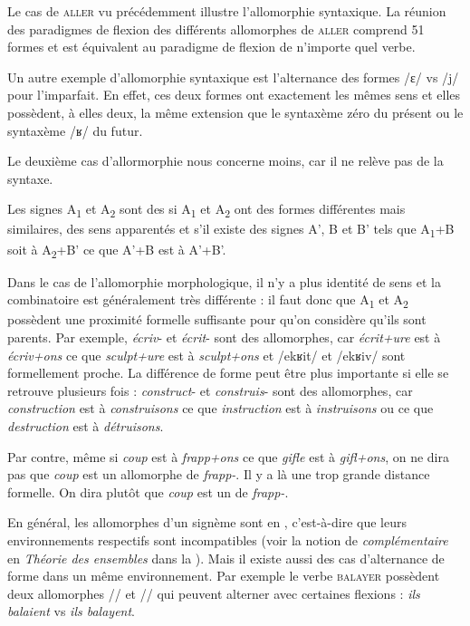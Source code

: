 Le cas de \textsc{aller} vu précédemment illustre l’allomorphie syntaxique. La réunion des paradigmes de flexion des différents allomorphes de \textsc{aller} comprend 51 formes et est équivalent au paradigme de flexion de n’importe quel verbe.

Un autre exemple d’allomorphie syntaxique est l’alternance des formes /ɛ/ vs /j/ pour l’imparfait. En effet, ces deux formes ont exactement les mêmes sens et elles possèdent, à elles deux, la même extension que le syntaxème zéro du présent ou le syntaxème /ʁ/ du futur.

Le deuxième cas d’allormorphie nous concerne moins, car il ne relève pas de la syntaxe.

\begin{styleLivreImportant}
Les signes A\textsubscript{1} et A\textsubscript{2} sont des  si A\textsubscript{1} et A\textsubscript{2} ont des formes différentes mais similaires, des sens apparentés et s’il existe des signes A’, B et B’ tels que A\textsubscript{1}+B soit à A\textsubscript{2}+B’ ce que A’+B est à A’+B’.
\end{styleLivreImportant}

Dans le cas de l’allomorphie morphologique, il n’y a plus identité de sens et la combinatoire est généralement très différente : il faut donc que A\textsubscript{1} et A\textsubscript{2} possèdent une proximité formelle suffisante pour qu’on considère qu’ils sont parents. Par exemple, \textit{écriv}{}- et \textit{écrit}{}- sont des allomorphes, car \textit{écrit+ure} est à \textit{écriv+ons} ce que \textit{sculpt+ure} est à \textit{sculpt+ons} et /ekʁit/ et /ekʁiv/ sont formellement proche. La différence de forme peut être plus importante si elle se retrouve plusieurs fois : \textit{construct}{}- et \textit{construis}{}- sont des allomorphes, car \textit{construction} est à \textit{construisons} ce que \textit{instruction} est à \textit{instruisons} ou ce que \textit{destruction} est à \textit{détruisons}.

Par contre, même si \textit{coup} est à \textit{frapp+ons} ce que \textit{gifle} est à \textit{gifl+ons}, on ne dira pas que \textit{coup} est un allomorphe de \textit{frapp-}. Il y a là une trop grande distance formelle. On dira plutôt que \textit{coup} est un  de \textit{frapp-}.

En général, les allomorphes d’un signème sont en , c’est-à-dire que leurs environnements respectifs sont incompatibles (voir la notion de \textit{complémentaire} en \textit{Théorie des ensembles} dans la ). Mais il existe aussi des cas d’alternance de forme dans un même environnement. Par exemple le verbe \textsc{balayer} possèdent deux allomorphes // et // qui peuvent alterner avec certaines flexions : \textit{ils balaient} vs \textit{ils balayent}.

